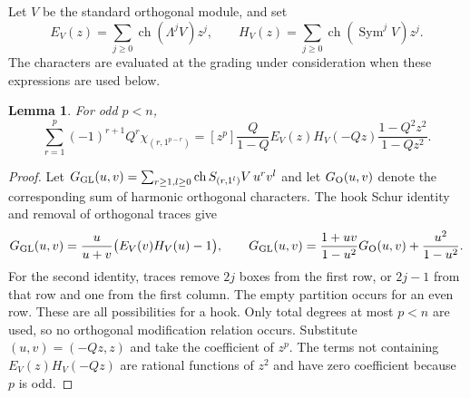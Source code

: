 \documentclass[11pt,a4paper]{amsart}
\numberwithin{equation}{section}
\newtheorem{lemma}[theorem]{Lemma}
\theoremstyle{definition}
\theoremstyle{remark}
\begin{document}
Let $V$ be the standard orthogonal module, and set
$$
 E_V(z)=\sum_{j\geq0}\operatorname{ch}(\Lambda^jV)z^j,
 \qquad
 H_V(z)=\sum_{j\geq0}\operatorname{ch}(\operatorname{Sym}^jV)z^j.
$$
The characters are evaluated at the grading under consideration when
these expressions are used below.

\begin{lemma}\label{B:uniform-hook-identity}
For odd $p<n$,
$$
 \sum_{r=1}^p(-1)^{r+1}Q^r\chi_{(r,1^{p-r})}
 =[z^p]\frac{Q}{1-Q}E_V(z)H_V(-Qz)
                   \frac{1-Q^2z^2}{1-Qz^2}.
$$
\end{lemma}
\begin{proof}
Let $G_{\rm GL}(u,v)=\sum_{r\geq1,l\geq0}
\operatorname{ch}S_{(r,1^l)}V\,u^rv^l$ and let $G_{\rm O}(u,v)$
denote the corresponding sum of harmonic orthogonal characters.
The hook Schur identity and removal of orthogonal traces give
$$
 G_{\rm GL}(u,v)=\frac{u}{u+v}\bigl(E_V(v)H_V(u)-1\bigr),
 \qquad
 G_{\rm GL}(u,v)=\frac{1+uv}{1-u^2}G_{\rm O}(u,v)
                         +\frac{u^2}{1-u^2}.
$$
For the second identity, traces remove $2j$ boxes from the first row,
or $2j-1$ from that row and one from the first column. The empty
partition occurs for an even row. These are all possibilities for
a hook. Only total degrees at most $p<n$ are used, so no orthogonal
modification relation occurs. Substitute $(u,v)=(-Qz,z)$ and take
the coefficient of $z^p$. The terms not containing
$E_V(z)H_V(-Qz)$ are rational functions of $z^2$ and have zero
coefficient because $p$ is odd.
\end{proof}
\end{document}
